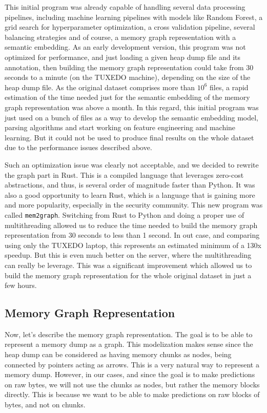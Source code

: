 This initial program was already capable of handling several data processing pipelines, including machine learning pipelines with models like Random Forest, a grid search for hyperparameter optimization, a cross validation pipeline, several balancing strategies and of course, a memory graph representation with a semantic embedding. As an early development version, this program was not optimized for performance, and just loading a given heap dump file and its annotation, then building the memory graph representation could take from 30 seconds to a minute (on the TUXEDO machine), depending on the size of the heap dump file. As the original dataset comprises more than $ 10^{6} $ files, a rapid estimation of the time needed just for the semantic embedding of the memory graph representation was above a month. In this regard, this initial program was just used on a bunch of files as a way to develop the semantic embedding model, parsing algorithms and start working on feature engineering and machine learning. But it could not be used to produce final results on the whole dataset due to the performance issues described above.

Such an optimization issue was clearly not acceptable, and we decided to rewrite the graph part in Rust. This is a compiled language that leverages zero-cost abstractions, and thus, is several order of magnitude faster than Python. It was also a good opportunity to learn Rust, which is a language that is gaining more and more popularity, especially in the security community. This new program was called \texttt{mem2graph}. Switching from Rust to Python and doing a proper use of multithreading allowed us to reduce the time needed to build the memory graph representation from 30 seconds to less than 1 second. In out case, and comparing using only the TUXEDO laptop, this represents an estimated minimum of a 130x speedup. But this is even much better on the server, where the multithreading can really be leverage. This was a significant improvement which allowed us to build the memory graph representation for the whole original dataset in just a few hours.

\subsection{Memory Graph Representation}
Now, let's describe the memory graph representation. The goal is to be able to represent a memory dump as a graph. This modelization makes sense since the heap dump can be considered as having memory chunks as nodes, being connected by pointers acting as arrows. This is a very natural way to represent a memory dump. However, in our cases, and since the goal is to make predictions on raw bytes, we will not use the chunks as nodes, but rather the memory blocks directly. This is because we want to be able to make predictions on raw blocks of bytes, and not on chunks. 

